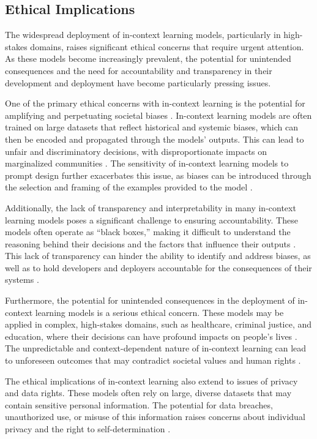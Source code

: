\documentclass[11pt]{article}
\begin{document}
\subsection{Ethical Implications}

The widespread deployment of in-context learning models, particularly in high-stakes domains, raises significant ethical concerns that require urgent attention. As these models become increasingly prevalent, the potential for unintended consequences and the need for accountability and transparency in their development and deployment have become particularly pressing issues.

One of the primary ethical concerns with in-context learning is the potential for amplifying and perpetuating societal biases \cite{ref337}. In-context learning models are often trained on large datasets that reflect historical and systemic biases, which can then be encoded and propagated through the models' outputs. This can lead to unfair and discriminatory decisions, with disproportionate impacts on marginalized communities \cite{ref338}. The sensitivity of in-context learning models to prompt design further exacerbates this issue, as biases can be introduced through the selection and framing of the examples provided to the model \cite{ref51}.

Additionally, the lack of transparency and interpretability in many in-context learning models poses a significant challenge to ensuring accountability. These models often operate as ``black boxes,'' making it difficult to understand the reasoning behind their decisions and the factors that influence their outputs \cite{ref339}. This lack of transparency can hinder the ability to identify and address biases, as well as to hold developers and deployers accountable for the consequences of their systems \cite{ref340}.

Furthermore, the potential for unintended consequences in the deployment of in-context learning models is a serious ethical concern. These models may be applied in complex, high-stakes domains, such as healthcare, criminal justice, and education, where their decisions can have profound impacts on people's lives \cite{ref341}. The unpredictable and context-dependent nature of in-context learning can lead to unforeseen outcomes that may contradict societal values and human rights \cite{ref56}.

The ethical implications of in-context learning also extend to issues of privacy and data rights. These models often rely on large, diverse datasets that may contain sensitive personal information. The potential for data breaches, unauthorized use, or misuse of this information raises concerns about individual privacy and the right to self-determination \cite{ref342}.
\end{document}
